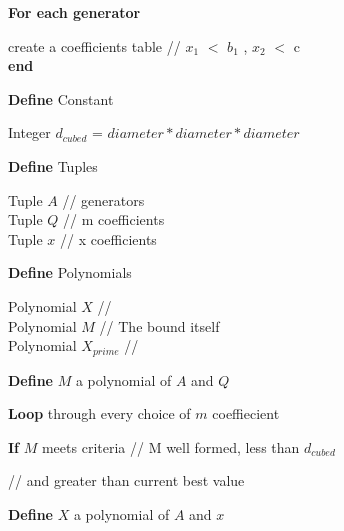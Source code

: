 \begin{centering}
\begin{block}\textbf{For each generator }  

\hspace{5mm}create a coefficients table  // $x_1$ $<$ $b_1$ , $x_2$ $<$ c \\
\textbf{end}

\vspace{3mm}
\textbf{Define} Constant 

\hspace{5mm}Integer $d_{cubed}$ = $diameter * diameter * diameter$
\vspace{5mm}

\vspace{3mm}
\textbf{Define} Tuples

\hspace{5mm}Tuple $A$ // generators\\
\hspace{5mm}Tuple $Q$  // m coefficients\\
\hspace{5mm}Tuple $x$  // x coefficients\\
\vspace{5mm}


\textbf{Define} Polynomials

\hspace{5mm}Polynomial $X$ // \\
\hspace{5mm}Polynomial $M$  // The bound itself\\
\hspace{5mm}Polynomial $X_{prime}$  // \\
\vspace{5mm}

\textbf{Define} $M$ a polynomial of $A$ and $Q$
\vspace{3mm}

\textbf{Loop} through every choice of $m$ coeffiecient
\vspace{2mm}

\hspace{5mm}\textbf{If} $M$ meets criteria // M well formed, less than $d_{cubed}$

\hspace{38mm}// and greater than current best  value
\vspace{2mm}

\hspace{10mm}\textbf{Define} $X$ a polynomial of $A$ and $x$
\vspace{2mm}


\end{block}
\end{centering}
